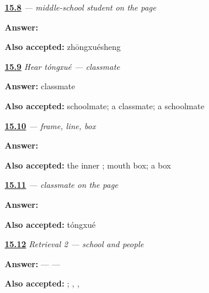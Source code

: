 \noindent\begin{minipage}[t]{\linewidth}
\raggedright
\hyperlink{review-ZH-C15-zhongxuesheng-write}{\textbf{15.8}} \emph{ — middle-school student on the page}\par
\small \textbf{Answer:} \par
\footnotesize \textbf{Also accepted:}  zhōngxuésheng
\end{minipage}\par\medskip

\noindent\begin{minipage}[t]{\linewidth}
\raggedright
\hyperlink{review-ZH-C15-hear-tongxue-meaning}{\textbf{15.9}} \emph{Hear \emph{tóngxué} — classmate}\par
\small \textbf{Answer:} classmate\par
\footnotesize \textbf{Also accepted:} schoolmate; a classmate; a schoolmate
\end{minipage}\par\medskip

\noindent\begin{minipage}[t]{\linewidth}
\raggedright
\hyperlink{review-ZH-W15-tong-order}{\textbf{15.10}} \emph{ — frame, line, box}\par
\small \textbf{Answer:} \par
\footnotesize \textbf{Also accepted:} the inner ; mouth box; a box
\end{minipage}\par\medskip

\noindent\begin{minipage}[t]{\linewidth}
\raggedright
\hyperlink{review-ZH-C15-tongxue-write}{\textbf{15.11}} \emph{ — classmate on the page}\par
\small \textbf{Answer:} \par
\footnotesize \textbf{Also accepted:}  tóngxué
\end{minipage}\par\medskip

\noindent\begin{minipage}[t]{\linewidth}
\raggedright
\hyperlink{review-ZH-R15-school-map-2-recall}{\textbf{15.12}} \emph{Retrieval 2 — school and people}\par
\small \textbf{Answer:}  —  — \par
\footnotesize \textbf{Also accepted:}   ; , , 
\end{minipage}\par\medskip

